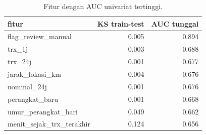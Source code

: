 \begin{table}[ht]
\centering\small
\begin{tabular}{lrr}
\toprule
fitur & KS train-test & AUC tunggal \\
\midrule
flag\_review\_manual & 0.005 & 0.894 \\
trx\_1j & 0.003 & 0.688 \\
trx\_24j & 0.001 & 0.677 \\
jarak\_lokasi\_km & 0.004 & 0.676 \\
nominal\_24j & 0.001 & 0.676 \\
perangkat\_baru & 0.001 & 0.668 \\
umur\_perangkat\_hari & 0.049 & 0.662 \\
menit\_sejak\_trx\_terakhir & 0.124 & 0.656 \\
\bottomrule
\end{tabular}
\caption{Fitur dengan AUC univariat tertinggi.}
\label{tab:t2_audit_auc}
\end{table}
